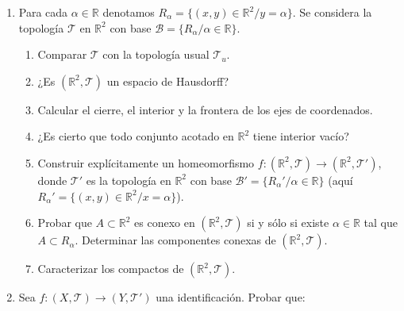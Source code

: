 \documentclass[fleqn]{article}
\begin{document}

\begin{enumerate}

  \item Para cada $\alpha \in \mathbb{R}$ denotamos $R_\alpha = \{(x, y) \in \mathbb{R}^2 / y = \alpha\}$. Se considera la topología $\mathcal{T}$ en $\mathbb{R}^2$ con base $\mathcal{B} = \{R_\alpha / \alpha \in \mathbb{R}\}$.

        \begin{enumerate}
          \item Comparar $\mathcal{T}$ con la topología usual $\mathcal{T}_u$.
          \item ¿Es $(\mathbb{R}^2, \mathcal{T})$ un espacio de Hausdorff?
          \item Calcular el cierre, el interior y la frontera de los ejes de coordenados.
          \item ¿Es cierto que todo conjunto acotado en $\mathbb{R}^2$ tiene interior vacío?
          \item Construir explícitamente un homeomorfismo $f : (\mathbb{R}^2, \mathcal{T}) \longrightarrow (\mathbb{R}^2, \mathcal{T}')$, donde $\mathcal{T}'$ es la topología en $\mathbb{R}^2$ con base $\mathcal{B}' = \{R_\alpha' / \alpha \in \mathbb{R}\}$ (aquí $R_\alpha' = \{(x, y) \in \mathbb{R}^2 / x = \alpha\}$).
          \item Probar que $A \subset \mathbb{R}^2$ es conexo en $(\mathbb{R}^2, \mathcal{T})$ si y sólo si existe $\alpha \in \mathbb{R}$ tal que $A \subset R_\alpha$. Determinar las componentes conexas de $(\mathbb{R}^2, \mathcal{T})$.
          \item Caracterizar los compactos de $(\mathbb{R}^2, \mathcal{T})$.
        \end{enumerate}

  \item Sea $f : (X, \mathcal{T}) \longrightarrow (Y, \mathcal{T}')$ una identificación. Probar que:


\end{enumerate}
\end{document}
